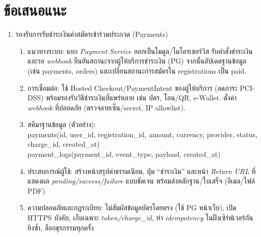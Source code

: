 \section*{ข้อเสนอแนะ}

\begin{sloppypar}
	\begin{enumerate}
		\item รองรับการรับชำระเงินค่าสมัครเข้าร่วมประกวด (Payments)
		\begin{enumerate}
			\item แนวทางระบบ: แยก \emph{Payment Service} ออกเป็นโมดูล/ไมโครเซอร์วิส รับคำสั่งชำระเงินและรอ \emph{webhook} ยืนยันสถานะจากผู้ให้บริการชำระเงิน (PG) จากนั้นอัปเดตฐานข้อมูล (เช่น payments, orders) และเปลี่ยนสถานะการสมัครใน registrations เป็น paid.
			\item การเชื่อมต่อ: ใช้ Hosted Checkout/PaymentIntent ของผู้ให้บริการ (ลดภาระ PCI-DSS) พร้อมรองรับวิธีชำระเงินที่แพร่หลาย เช่น บัตร, โอน/QR, e-Wallet. ตั้งค่า \emph{webhook} ที่ปลอดภัย (ตรวจลายเซ็น/secret, IP allowlist).
			\item สคีมาฐานข้อมูล (ตัวอย่าง): \\
			payments(id, user\_id, registration\_id, amount, currency, provider, status, charge\_id, created\_at) \\
			payment\_logs(payment\_id, event\_type, payload, created\_at)
			\item ประสบการณ์ผู้ใช้: สร้างหน้าสรุปค่าธรรมเนียม, ปุ่ม ``ชำระเงิน'' และหน้า \emph{Return URL} ที่แสดงผล \emph{pending/success/failure} แบบชัดเจน พร้อมส่งหลักฐาน/ใบเสร็จ (อีเมล/ไฟล์ PDF)
			\item ความปลอดภัยและกฎระเบียบ: ไม่สัมผัสข้อมูลบัตรโดยตรง (ใช้ PG หน้าเว็บ), เปิด HTTPS บังคับ, เก็บเฉพาะ \emph{token/charge\_id}, ทำ \emph{idempotency} ในฝั่งเซิร์ฟเวอร์กันยิงซ้ำ, ล็อกธุรกรรมทุกครั้ง
		\end{enumerate}
		

\end{enumerate}
\end{sloppypar}
